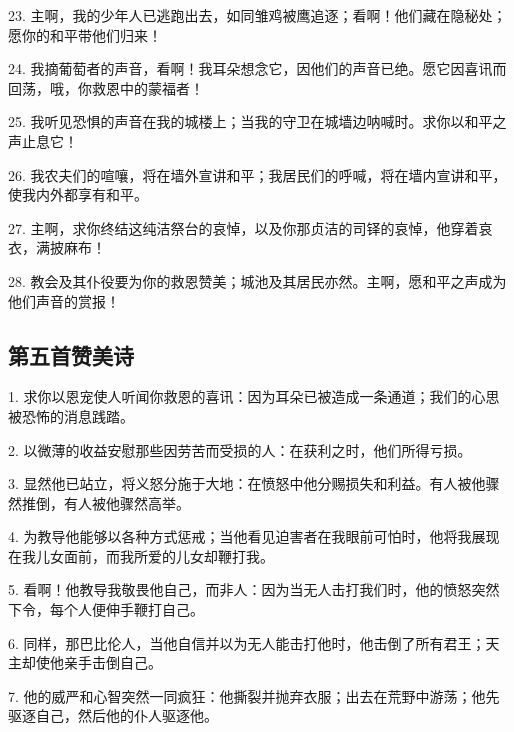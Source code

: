 23. 主啊，我的少年人已逃跑出去，如同雏鸡被鹰追逐；看啊！他们藏在隐秘处；愿你的和平带他们归来！\par

24. 我摘葡萄者的声音，看啊！我耳朵想念它，因他们的声音已绝。愿它因喜讯而回荡，哦，你救恩中的蒙福者！\par

25. 我听见恐惧的声音在我的城楼上；当我的守卫在城墙边呐喊时。求你以和平之声止息它！\par

26. 我农夫们的喧嚷，将在墙外宣讲和平；我居民们的呼喊，将在墙内宣讲和平，使我内外都享有和平。\par

27. 主啊，求你终结这纯洁祭台的哀悼，以及你那贞洁的司铎的哀悼，他穿着哀衣，满披麻布！\par

28. 教会及其仆役要为你的救恩赞美；城池及其居民亦然。主啊，愿和平之声成为他们声音的赏报！\par


\subsection{第五首赞美诗}

1. 求你以恩宠使人听闻你救恩的喜讯：因为耳朵已被造成一条通道；我们的心思被恐怖的消息践踏。\par

2. 以微薄的收益安慰那些因劳苦而受损的人：在获利之时，他们所得亏损。\par

3. 显然他已站立，将义怒分施于大地：在愤怒中他分赐损失和利益。有人被他骤然推倒，有人被他骤然高举。\par

4. 为教导他能够以各种方式惩戒；当他看见迫害者在我眼前可怕时，他将我展现在我儿女面前，而我所爱的儿女却鞭打我。\par

5. 看啊！他教导我敬畏他自己，而非人：因为当无人击打我们时，他的愤怒突然下令，每个人便伸手鞭打自己。\par

6. 同样，那巴比伦人，当他自信并以为无人能击打他时，他击倒了所有君王；天主却使他亲手击倒自己。\par

7. 他的威严和心智突然一同疯狂：他撕裂并抛弃衣服；出去在荒野中游荡；他先驱逐自己，然后他的仆人驱逐他。\par

